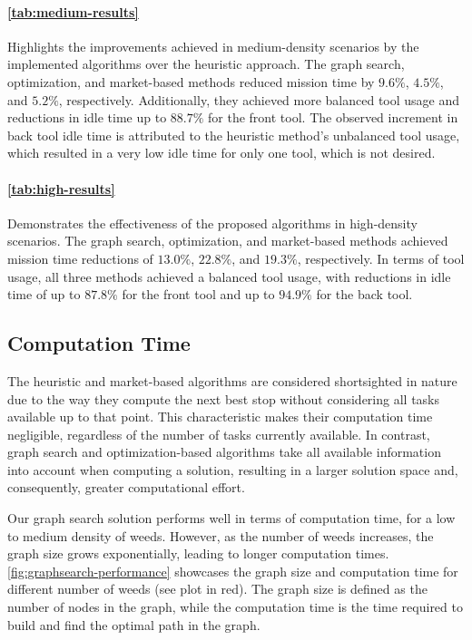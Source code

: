\paragraph{\autoref{tab:medium-results}} Highlights the improvements achieved in medium-density scenarios by the implemented algorithms over the heuristic approach. The graph search, optimization, and market-based methods reduced mission time by $9.6\%$, $4.5\%$, and $5.2\%$, respectively. Additionally, they achieved more balanced tool usage and reductions in idle time up to $88.7\%$ for the front tool. The observed increment in back tool idle time is attributed to the heuristic method’s unbalanced tool usage, which resulted in a very low idle time for only one tool, which is not desired.

\paragraph{\autoref{tab:high-results}} Demonstrates the effectiveness of the proposed algorithms in high-density scenarios. The graph search, optimization, and market-based methods achieved mission time reductions of $13.0\%$, $22.8\%$, and $19.3\%$, respectively. In terms of tool usage, all three methods achieved a balanced tool usage, with reductions in idle time of up to $87.8\%$ for the front tool and up to $94.9\%$ for the back tool.

\subsection{Computation Time}\label{sec:computation-time}
The heuristic and market-based algorithms are considered shortsighted in nature due to the way they compute the next best stop without considering all tasks available up to that point. This characteristic makes their computation time negligible, regardless of the number of tasks currently available. In contrast, graph search and optimization-based algorithms take all available information into account when computing a solution, resulting in a larger solution space and, consequently, greater computational effort.

Our graph search solution performs well in terms of computation time, for a low to medium density of weeds. However, as the number of weeds increases, the graph size grows exponentially, leading to longer computation times. \autoref{fig:graphsearch-performance} showcases the graph size and computation time for different number of weeds (see plot in red). The graph size is defined as the number of nodes in the graph, while the computation time is the time required to build and find the optimal path in the graph.

